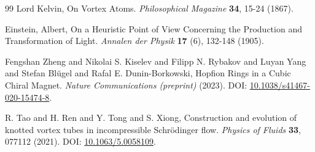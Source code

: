 \documentclass[preprint]{revtex4-2}
\begin{document}
\begin{thebibliography}{99}
Lord Kelvin,
\newblock On Vortex Atoms.
\textit{Philosophical Magazine} \textbf{34}, 15-24 (1867).


Einstein, Albert,
\newblock On a Heuristic Point of View Concerning the Production and Transformation of Light.
\textit{Annalen der Physik} \textbf{17} (6), 132-148 (1905).


Fengshan Zheng and Nikolai S. Kiselev and Filipp N. Rybakov and Luyan Yang and Stefan Blügel and Rafal E. Dunin-Borkowski,
\newblock Hopfion Rings in a Cubic Chiral Magnet.
\textit{Nature Communications (preprint)} (2023).
\newblock DOI: \href{https://doi.org/10.1038/s41467-020-15474-8}{10.1038/s41467-020-15474-8}.


R. Tao and H. Ren and Y. Tong and S. Xiong,
\newblock Construction and evolution of knotted vortex tubes in incompressible Schrödinger flow.
\textit{Physics of Fluids} \textbf{33}, 077112 (2021).
\newblock DOI: \href{https://doi.org/10.1063/5.0058109}{10.1063/5.0058109}.


\end{thebibliography}
\end{document}
